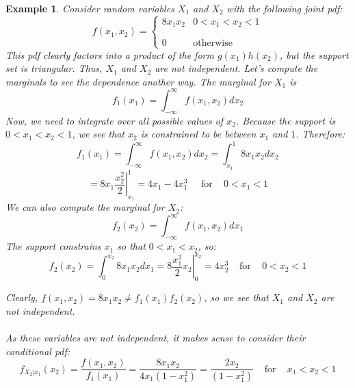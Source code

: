 \documentclass[12pt]{article} %
\newtheorem{example}{Example}
\begin{document}
\begin{example}
Consider random variables $X_1$ and $X_2$ with the following joint pdf:
$$f(x_1,x_2) = \left\{\begin{matrix}
8x_1x_2 & 0<x_1<x_2<1\\\\\\0&\textrm{otherwise}
\end{matrix}\right.$$
This pdf clearly factors into a product of the form $g(x_1)h(x_2)$, but the support set is \emph{triangular}. Thus, $X_1$ and $X_2$ are not independent. Let's compute the marginals to see the dependence another way. The marginal for $X_1$ is
$$f_1(x_1) = \int_{-\infty}^\infty f(x_1,x_2)dx_2$$
Now, we need to integrate over all \emph{possible} values of $x_2$. Because the support is $0<x_1<x_2<1$, we see that $x_2$ is constrained to be between $x_1$ and $1$. Therefore:
 $$f_1(x_1) = \int_{-\infty}^\infty f(x_1,x_2)dx_2 = \int_{x_1}^1 8x_1x_2 dx_2$$
 $$= \left. 8x_1 \frac{x^2_2}2\right\rvert_{x_1}^1 = 4x_1-4x_1^3 \;\;\;\;\; \textrm{for }\;\;\; 0< x_1 <1$$
 We can also compute the marginal for $X_2$:
 $$f_2(x_2) = \int_{-\infty}^\infty f(x_1,x_2)dx_1$$
 The support constrains $x_1$ so that $0<x_1<x_2$, so:
 $$f_2(x_2) = \int_{0}^{x_2} 8x_1x_2dx_1 = \left.8\frac{x_1^2}2 x_2\right\rvert_0^{x_2} = 4x_2^3 \;\;\;\;\textrm{for } \;\;\; 0< x_2< 1$$
 
 Clearly, $f(x_1,x_2) = 8x_1x_2 \neq f_1(x_1)f_2(x_2)$, so we see that $X_1$ and $X_2$ are not independent. \\\\
As these variables are not independent, it makes sense to consider their conditional pdf:
$$f_{X_2|x_1}(x_2) = \frac{f(x_1,x_2)}{f_1(x_1)} = \frac{8x_1x_2}{4x_1(1-x_1^2)} =  \frac{2x_2}{(1-x_1^2)} \;\;\;\;\textrm{for } \;\;\; x_1< x_2< 1$$
\end{example}
\end{document}
